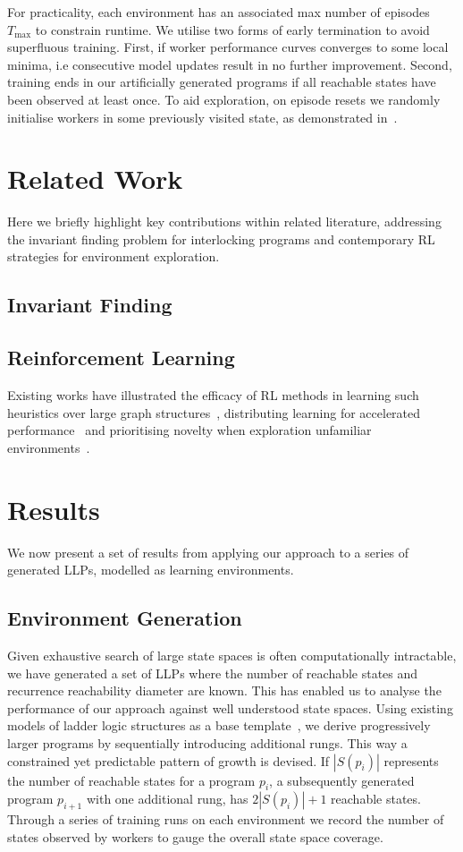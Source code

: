 \documentclass[conference,compsoc]{IEEEtran}
\begin{document}
For practicality, each environment has an associated max number of episodes $T_{\max}$ to constrain runtime. We utilise two forms of early termination to avoid superfluous training. First, if worker performance curves converges to some local minima, i.e consecutive model updates result in no further improvement. Second, training ends in our artificially generated programs if all reachable states have been observed at least once. To aid exploration, on episode resets we randomly initialise workers in some previously visited state, as demonstrated in~\cite{gordillo2021improving}. 

\section{Related Work}
Here we briefly highlight key contributions within related literature, addressing the invariant finding problem for interlocking programs and contemporary RL strategies for environment exploration.

\subsection{Invariant Finding}


\subsection{Reinforcement Learning}
Existing works have illustrated the efficacy of RL methods in learning such heuristics over large graph structures~\cite{manchanda2019learning}, distributing learning for accelerated performance~\cite{hoffman2020acme} and prioritising novelty when exploration unfamiliar environments~\cite{ostrovski2017countbased, haarnoja2018soft, gordillo2021improving}.

\section{Results}
We now present a set of results from applying our approach to a series of generated LLPs, modelled as learning environments. 
\subsection{Environment Generation}

Given exhaustive search of large state spaces is often computationally intractable, we have generated a set of LLPs where the number of reachable states and recurrence reachability diameter are known. This has enabled us to analyse the performance of our approach against well understood state spaces. Using existing models of ladder logic structures as a base template~\cite{james2013verification}, we derive progressively larger programs by sequentially introducing additional rungs. This way a constrained yet predictable pattern of growth is devised. If $|S(p_i)|$ represents the number of reachable states for a program $p_i$, a subsequently generated program $p_{i+1}$ with one additional rung, has $2|S(p_i)|+1$ reachable states. Through a series of training runs on each environment we record the number of states observed by workers to gauge the overall state space coverage. 
\end{document}
